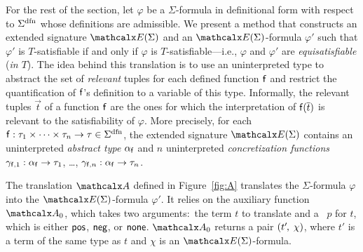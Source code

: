 For the rest of the section, let $\varphi$ be a $\Sigma$-formula
in definitional form with respect to $\sfundefs{\Sigma}$
whose definitions are admissible.
We present a method that constructs an extended signature
$\extendsig{ \Sigma }$ and an $\extendsig{ \Sigma }$-formula $\varphi'$ such that
$\varphi'$ is $T$-satisfiable if and only if $\varphi$ is $T$-satisfiable---i.e.,
$\varphi$ and $\varphi'$ are \emph{equisatisfiable} (\emph{in $T$}).
The idea behind this translation
is to use an uninterpreted type to abstract the set of
\emph{relevant} tuples for each defined function $\mathsf{f}$ and restrict the
quantification of $\mathsf{f}$'s definition to a variable of this
type.
Informally, the relevant tuples $\vec t$ of a function $\mathsf{f}$ are the
ones for which the interpretation of $\mathsf{f}( \overline{t} )$ is relevant to the
satisfiability of $\varphi$.
More precisely,
for each $\con{f} : \tau_1 \times \cdots \times \tau_n \rightarrow \tau \in \sfundefs{\Sigma}$,
the extended signature $\extendsig{\Sigma}$ contains
an uninterpreted \emph{abstract type} $\alpha_{\mathsf{f}}$ and
$n$ uninterpreted \emph{concretization functions} $\gamma_{\mathsf{f},1} : \alpha_{\mathsf{f}} \rightarrow \tau_1$, \ldots, $\gamma_{\mathsf{f},n} : \alpha_{\mathsf{f}} \rightarrow \tau_n$.

The translation $\conv$ defined in Figure~\ref{fig:A} translates the $\Sigma$-formula
$\varphi$ into the $\extendsig{\Sigma}$-formula $\varphi'$. It relies
on the auxiliary function $\conv_0$, which takes two arguments:\ the term $t$
to translate and a ~$p$ for $t$, which is either $\mathsf{pos}$, $\mathsf{neg}$, or
$\mathsf{none}$.
\vthinspace$\conv_0$ returns a pair $( t'\negvthinspace,\, \chi )$, where $t'$ is a term of
the same type as $t$ and $\chi$ is an $\extendsig{\Sigma}$-formula.


